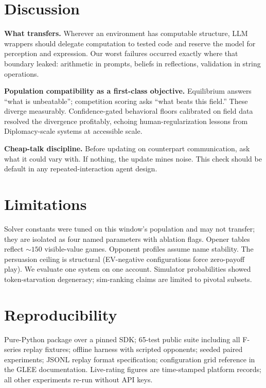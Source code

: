 \documentclass[11pt]{article}
\begin{document}
\section{Discussion}
\textbf{What transfers.} Wherever an environment has computable structure, LLM wrappers should delegate computation to tested code and reserve the model for perception and expression. Our worst failures occurred exactly where that boundary leaked: arithmetic in prompts, beliefs in reflections, validation in string operations.

\textbf{Population compatibility as a first-class objective.} Equilibrium answers ``what is unbeatable''; competition scoring asks ``what beats this field.'' These diverge measurably. Confidence-gated behavioral floors calibrated on field data resolved the divergence profitably, echoing human-regularization lessons from Diplomacy-scale systems at accessible scale.

\textbf{Cheap-talk discipline.} Before updating on counterpart communication, ask what it could vary with. If nothing, the update mines noise. This check should be default in any repeated-interaction agent design.

\section*{Limitations}
Solver constants were tuned on this window's population and may not transfer; they are isolated as four named parameters with ablation flags. Opener tables reflect ${\sim}150$ visible-value games. Opponent profiles assume name stability. The persuasion ceiling is structural (EV-negative configurations force zero-payoff play). We evaluate one system on one account. Simulator probabilities showed token-starvation degeneracy; sim-ranking claims are limited to pivotal subsets.

\section*{Reproducibility}
Pure-Python package over a pinned SDK; 65-test public suite including all F-series replay fixtures; offline harness with scripted opponents; seeded paired experiments; JSONL replay format specification; configuration grid reference in the GLEE documentation. Live-rating figures are time-stamped platform records; all other experiments re-run without API keys.
\end{document}
